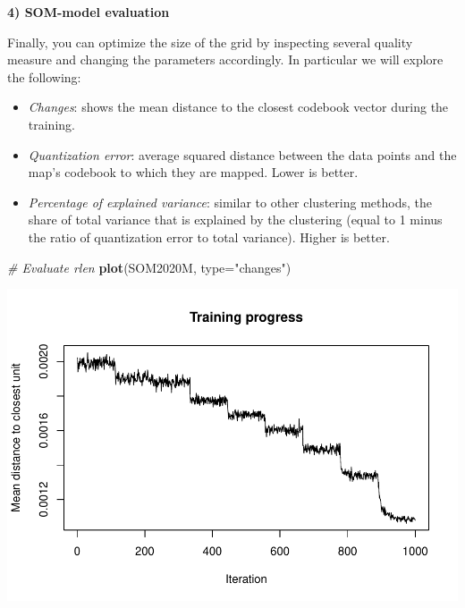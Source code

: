 \documentclass[
]{book}
\newenvironment{Shaded}{\begin{snugshade}}{\end{snugshade}}
\newcommand{\AttributeTok}[1]{\textcolor[rgb]{0.13,0.29,0.53}{#1}}
\newcommand{\CommentTok}[1]{\textcolor[rgb]{0.56,0.35,0.01}{\textit{#1}}}
\newcommand{\DocumentationTok}[1]{\textcolor[rgb]{0.56,0.35,0.01}{\textbf{\textit{#1}}}}
\newcommand{\FunctionTok}[1]{\textcolor[rgb]{0.13,0.29,0.53}{\textbf{#1}}}
\newcommand{\NormalTok}[1]{#1}
\newcommand{\OtherTok}[1]{\textcolor[rgb]{0.56,0.35,0.01}{#1}}
\newcommand{\SpecialCharTok}[1]{\textcolor[rgb]{0.81,0.36,0.00}{\textbf{#1}}}
\newcommand{\StringTok}[1]{\textcolor[rgb]{0.31,0.60,0.02}{#1}}
\begin{document}
\textbf{4) SOM-model evaluation}

Finally, you can optimize the size of the grid by inspecting several quality measure and changing the parameters accordingly.
In particular we will explore the following:

\begin{itemize}
\item
  \emph{Changes}: shows the mean distance to the closest codebook vector during the training.
\item
  \emph{Quantization error}: average squared distance between the data points and the map's codebook to which they are mapped.
  Lower is better.
\item
  \emph{Percentage of explained variance}: similar to other clustering methods, the share of total variance that is explained by the clustering (equal to 1 minus the ratio of quantization error to total variance).
  Higher is better.
\end{itemize}

\begin{Shaded}
\begin{Highlighting}[]
\CommentTok{\# Evaluate rlen}
\FunctionTok{plot}\NormalTok{(SOM2020M, }\AttributeTok{type=}\StringTok{"changes"}\NormalTok{)}
\end{Highlighting}
\end{Shaded}

\includegraphics{05-SOM_files/figure-latex/SOM-quality-1.pdf}

\begin{Shaded}
\end{Shaded}
\end{document}
